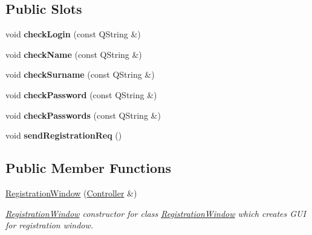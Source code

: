 \subsection*{Public Slots}
\begin{DoxyCompactItemize}
\item 
void {\bfseries check\+Login} (const Q\+String \&)\hypertarget{classRegistrationWindow_a054fcf4544f917e106aa6760f720d7b2}{}\label{classRegistrationWindow_a054fcf4544f917e106aa6760f720d7b2}

\item 
void {\bfseries check\+Name} (const Q\+String \&)\hypertarget{classRegistrationWindow_a26d58595ac8df47a0456878a80c45ffc}{}\label{classRegistrationWindow_a26d58595ac8df47a0456878a80c45ffc}

\item 
void {\bfseries check\+Surname} (const Q\+String \&)\hypertarget{classRegistrationWindow_a6fc9f673b5e1d2fd15c9e12bfc0174b2}{}\label{classRegistrationWindow_a6fc9f673b5e1d2fd15c9e12bfc0174b2}

\item 
void {\bfseries check\+Password} (const Q\+String \&)\hypertarget{classRegistrationWindow_a761ec197a38b335aaa5db06287361849}{}\label{classRegistrationWindow_a761ec197a38b335aaa5db06287361849}

\item 
void {\bfseries check\+Passwords} (const Q\+String \&)\hypertarget{classRegistrationWindow_a6c3761195b00134d3ef4decf91ea76e7}{}\label{classRegistrationWindow_a6c3761195b00134d3ef4decf91ea76e7}

\item 
void {\bfseries send\+Registration\+Req} ()\hypertarget{classRegistrationWindow_a4344e4dafa6ab47e564c243b20a0c7a4}{}\label{classRegistrationWindow_a4344e4dafa6ab47e564c243b20a0c7a4}

\end{DoxyCompactItemize}
\subsection*{Public Member Functions}
\begin{DoxyCompactItemize}
\item 
\hyperlink{classRegistrationWindow_ac8876ad29199208fc8b8bd25863c9318}{Registration\+Window} (\hyperlink{classController}{Controller} \&)
\begin{DoxyCompactList}\small\item\em \hyperlink{classRegistrationWindow}{Registration\+Window} constructor for class \hyperlink{classRegistrationWindow}{Registration\+Window} which creates G\+UI for registration window. \end{DoxyCompactList}\end{DoxyCompactItemize}


